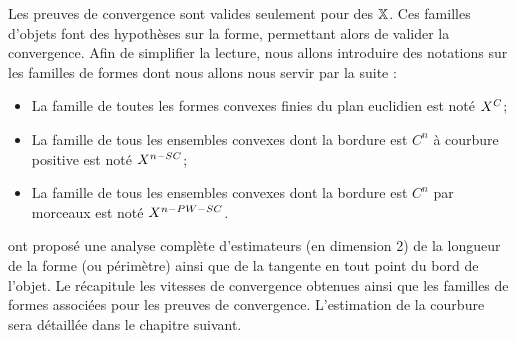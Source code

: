 Les preuves de convergence sont valides seulement pour des  $\mathbb{X}$. Ces familles d'objets font des hypothèses sur la forme,
permettant alors de valider la convergence. Afin de simplifier la lecture, nous
allons introduire des notations sur les familles de formes dont nous allons nous
servir par la suite :
%
\begin{itemize}
  \item La famille de toutes les formes convexes finies du plan euclidien est noté $X^{C}$;
  \item La famille de tous les ensembles convexes dont la bordure est $C^n$ à courbure positive est noté $X^{n-SC}$;
  \item La famille de tous les ensembles convexes dont la bordure est $C^n$ par morceaux est noté $X^{n-PW-SC}$.
\end{itemize}
%
%

 ont proposé une analyse
complète d'estimateurs (en dimension 2) de la longueur de la forme (ou
périmètre) ainsi que de la tangente en tout point du bord de l'objet. Le
 récapitule les vitesses de convergence obtenues ainsi
que les familles de formes associées pour les preuves de convergence.
L'estimation de la courbure sera détaillée dans le chapitre suivant.


